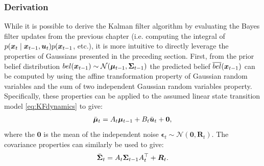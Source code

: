 \subsubsection{Derivation}
While it is possible to derive the Kalman filter algorithm by evaluating the Bayes filter updates from the previous chapter (i.e. computing the integral of $p(\bm{x}_t \mid \bm{x}_{t-1}, \bm{u}_t) p(\bm{x}_{t-1}$, etc.), it is more intuitive to directly leverage the properties of Gaussians presented in the preceding section. First, from the prior belief distribution $bel(\bm{x}_{t-1}) \sim \mathcal{N}(\bm{\mu}_{t-1},\bm{\Sigma}_{t-1})$ the predicted belief $\overline{bel}(\bm{x}_{t-1})$ can be computed by using the affine transformation property of Gaussian random variables and the sum of two independent Gaussian random variables property. Specifically, these properties can be applied to the assumed linear state transition model \eqref{eq:KFdynamics} to give:
\begin{equation*}
\begin{split}
\bar{\bm{\mu}}_t &= A_t \bm{\mu}_{t-1} + B_t\bar{\bm{u}}_t + \bm{0}, \\
\end{split}
\end{equation*}
where the $\bm{0}$ is the mean of the independent noise $\bm{\epsilon}_t \sim \mathcal{N}(\bm{0},\bm{R}_t)$. The covariance properties can similarly be used to give:
\begin{equation*}
\begin{split}
\bar{\bm{\Sigma}}_t &= A_t \bm{\Sigma}_{t-1}A_t^\top  + \bm{R}_t. \\
\end{split}
\end{equation*}

